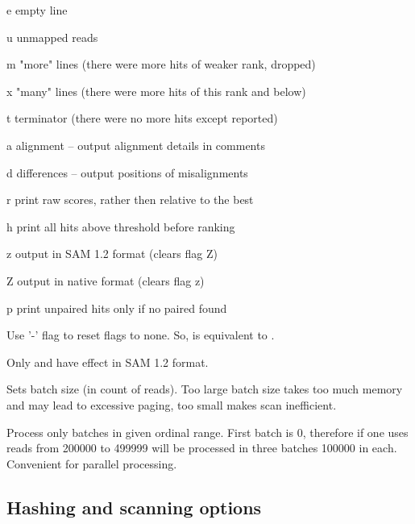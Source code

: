 \documentclass[english,letter]{article}
\begin{document}
\begin{description}
	\begin{Description}[w]
	\item[e] empty line
    \item[u] unmapped reads
    \item[m] "more" lines (there were more hits of weaker rank, dropped)
    \item[x] "many" lines (there were more hits of this rank and below)
    \item[t] terminator (there were no more hits except reported)
    \item[a] alignment -- output alignment details in comments 
    \item[d] differences -- output positions of misalignments
    \item[r] print raw scores, rather then relative to the best
    \item[h] print all hits above threshold before ranking
	\item[z] output in SAM 1.2 format (clears flag Z)
	\item[Z] output in native format (clears flag z)
	\item[p] print unpaired hits only if no paired found
	\end{Description}

                Use '-' flag to reset flags to none. So,   is
                equivalent to .

				Only  and  have effect in SAM 1.2 format.
\item[\OptArg{--batch-size}{=count}~~\OptArg{-B}{~count}]
				Sets batch size (in count of reads). Too large batch size
                takes too much memory and may lead to excessive paging, too
                small makes scan inefficient. 
\item[\OptArg{--batch-range}{=min\Lbr-max\Rbr}]
                Process only batches in given ordinal range. First batch is 0,
                therefore if one uses   reads from 
                200000 to 499999 will be processed in three batches 100000 in
                each. Convenient for parallel processing.
\end{description}

\subsection{Hashing and scanning options}
\end{document}
